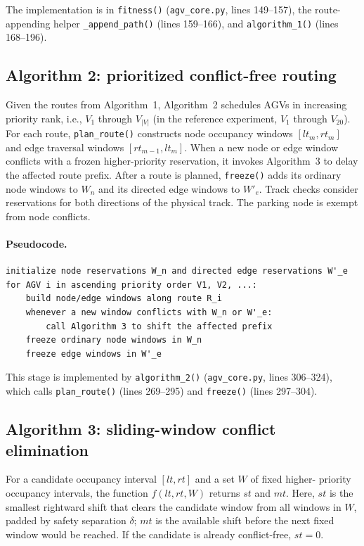 \documentclass[11pt]{article}
\begin{document}
The implementation is in \texttt{fitness()} (\texttt{agv\_core.py},
lines 149--157), the route-appending helper \texttt{\_append\_path()}
(lines 159--166), and \texttt{algorithm\_1()} (lines 168--196).

\subsection{Algorithm 2: prioritized conflict-free routing}

Given the routes from Algorithm~1, Algorithm~2 schedules AGVs in increasing
priority rank, i.e., $V_1$ through $V_{|V|}$ (in the reference experiment,
$V_1$ through $V_{20}$). For each route, \texttt{plan\_route()} constructs
node occupancy windows $[lt_m,rt_m]$ and edge traversal windows
$[rt_{m-1},lt_m]$. When a new node or edge window conflicts with a frozen
higher-priority reservation, it invokes Algorithm~3 to delay the affected
route prefix. After a route is planned, \texttt{freeze()} adds its ordinary
node windows to $W_n$ and its directed edge windows to $W'_e$. Track checks
consider reservations for both directions of the physical track. The parking
node is exempt from node conflicts.

\paragraph{Pseudocode.}
\begin{verbatim}
initialize node reservations W_n and directed edge reservations W'_e
for AGV i in ascending priority order V1, V2, ...:
    build node/edge windows along route R_i
    whenever a new window conflicts with W_n or W'_e:
        call Algorithm 3 to shift the affected prefix
    freeze ordinary node windows in W_n
    freeze edge windows in W'_e
\end{verbatim}

This stage is implemented by \texttt{algorithm\_2()} (\texttt{agv\_core.py},
lines 306--324), which calls \texttt{plan\_route()} (lines 269--295) and
\texttt{freeze()} (lines 297--304).

\subsection{Algorithm 3: sliding-window conflict elimination}

For a candidate occupancy interval $[lt,rt]$ and a set $W$ of fixed higher-
priority occupancy intervals, the function $f(lt,rt,W)$ returns $st$ and
$mt$. Here, $st$ is the smallest rightward shift that clears the candidate
window from all windows in $W$, padded by safety separation $\delta$; $mt$
is the available shift before the next fixed window would be reached. If the
candidate is already conflict-free, $st=0$.
\end{document}
